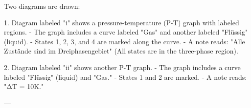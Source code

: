 Two diagrams are drawn:  

1. Diagram labeled "i" shows a pressure-temperature (P-T) graph with labeled regions.  
   - The graph includes a curve labeled "Gas" and another labeled "Flüssig" (liquid).  
   - States 1, 2, 3, and 4 are marked along the curve.  
   - A note reads: "Alle Zustände sind im Dreiphasengebiet" (All states are in the three-phase region).  

2. Diagram labeled "ii" shows another P-T graph.  
   - The graph includes a curve labeled "Flüssig" (liquid) and "Gas."  
   - States 1 and 2 are marked.  
   - A note reads: "ΔT = 10K."  

---